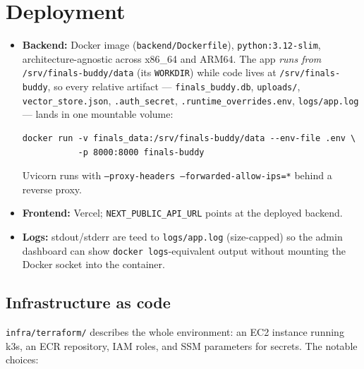 \documentclass[11pt,a4paper]{article}
\newcommand{\code}[1]{\colorbox{fbCream}{\texttt{\small #1}}}
\begin{document}
\section{Deployment}

\begin{itemize}[leftmargin=1.4em]
\item \textbf{Backend:} Docker image (\code{backend/Dockerfile}),
  \code{python:3.12-slim}, architecture-agnostic across x86\_64 and ARM64. The
  app \emph{runs from} \code{/srv/finals-buddy/data} (its \code{WORKDIR}) while
  code lives at \code{/srv/finals-buddy}, so every relative artifact ---
  \code{finals\_buddy.db}, \code{uploads/}, \code{vector\_store.json},
  \code{.auth\_secret}, \code{.runtime\_overrides.env}, \code{logs/app.log} ---
  lands in one mountable volume:
\begin{lstlisting}
docker run -v finals_data:/srv/finals-buddy/data --env-file .env \
           -p 8000:8000 finals-buddy
\end{lstlisting}
  Uvicorn runs with \code{--proxy-headers --forwarded-allow-ips=*} behind a
  reverse proxy.
\item \textbf{Frontend:} Vercel; \code{NEXT\_PUBLIC\_API\_URL} points at the
  deployed backend.
\item \textbf{Logs:} stdout/stderr are teed to \code{logs/app.log} (size-capped)
  so the admin dashboard can show \code{docker logs}-equivalent output without
  mounting the Docker socket into the container.
\end{itemize}

\subsection{Infrastructure as code}

\code{infra/terraform/} describes the whole environment: an EC2 instance running
k3s, an ECR repository, IAM roles, and SSM parameters for secrets. The notable
choices:
\end{document}
